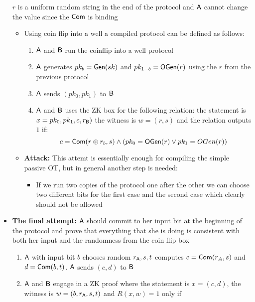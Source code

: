\begin{itemize}
\begin{itemize}
\begin{enumerate}
        \end{enumerate}
    \end{itemize}
    $r$ is a uniform random string in the end of the protocol and $\mathsf{A}$ cannot change the value since the $\mathsf{Com}$ is binding
    \begin{itemize}
        \item Using coin flip into a well a compiled protocol can be defined as follows:
        \begin{enumerate}
            \item $\mathsf{A}$ and $\mathsf{B}$ run the coinflip into a well protocol
            \item $\mathsf{A}$ generates $pk_b = \mathsf{Gen}(sk)$ and $pk_{1-b} = \mathsf{OGen}(r)$ using the $r$ from the previous protocol
            \item $\mathsf{A}$ sends $(pk_0, pk_1)$ to $\mathsf{B}$
            \item $\mathsf{A}$ and $\mathsf{B}$ uses the ZK box for the following relation: the statement is $x = pk_0, pk_1, c, r_{\mathsf{B}})$ the witness is $w = (r,s)$ and the relation outputs $1$ if:
            \begin{equation*}
                c= \mathsf{Com}(r \oplus r_b, s) \land (pk_0 = \mathsf{OGen}(r) \lor pk_1 = OGen(r))
            \end{equation*}
        \end{enumerate}
        \item \textbf{Attack:} This attemt is essentially enough for compiling the simple passive OT, but in general another step is needed:
        \begin{itemize}
            \item If we run two copies of the protocol one after the other we can choose two different bits for the first case and the second case which clearly should not be allowed
        \end{itemize}
    \end{itemize}
    \item \textbf{The final attempt:} $\mathsf{A}$ should commit to her input bit at the beginning of the protocol and prove that everything that she is doing is consistent with both her input and the randomness from the coin flip box
    \begin{enumerate}
        \item $\mathsf{A}$ with input bit $b$ chooses random $r_{\mathsf{A}}, s, t$ computes $c= \mathsf{Com}(r_A, s)$ and $d= \mathsf{Com}(b,t)$. $\mathsf{A}$ sends $(c,d)$ to $\mathsf{B}$
        \item $\mathsf{A}$ and $\mathsf{B}$ engage in a ZK proof where the statement is $x = (c,d)$, the witness is $w=(b, r_{\mathsf{A}}, s ,t)$ and $R(x,w) = 1$ only if

\end{enumerate}
\end{itemize}
